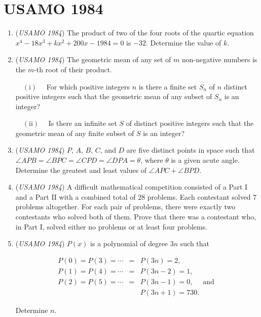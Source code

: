 \section{USAMO 1984}
        \begin{enumerate}
        	\item (\textit{USAMO 1984}) The product of two of the four roots of the quartic equation $x^4 - 18x^3 + kx^2+200x-1984=0$ is $-32$. Determine the value of $k$.


 

	\item (\textit{USAMO 1984}) The geometric mean of any set of $m$ non-negative numbers is the $m$-th root of their product.


 $\quad (\text{i})\quad$ For which positive integers $n$ is there a finite set $S_n$ of $n$ distinct positive integers such that the geometric mean of any subset of $S_n$ is an integer?


 $\quad (\text{ii})\quad$ Is there an infinite set $S$ of distinct positive integers such that the geometric mean of any finite subset of $S$ is an integer?


 

	\item (\textit{USAMO 1984}) $P$, $A$, $B$, $C$, and $D$ are five distinct points in space such that $\angle APB = \angle BPC = \angle CPD = \angle DPA = \theta$, where $\theta$ is a given acute angle. Determine the greatest and least values of $\angle APC + \angle BPD$.


 

	\item (\textit{USAMO 1984}) A difficult mathematical competition consisted of a Part I and a Part II with a combined total of $28$ problems. Each contestant solved $7$ problems altogether. For each pair of problems, there were exactly two contestants who solved both of them. Prove that there was a contestant who, in Part I, solved either no problems or at least four problems.


 

	\item (\textit{USAMO 1984}) $P(x)$ is a polynomial of degree $3n$ such that


 
 \begin{eqnarray*} P(0) = P(3) = \cdots &=& P(3n) = 2, \\ P(1) = P(4) = \cdots &=& P(3n-2) = 1, \\ P(2) = P(5) = \cdots &=& P(3n-1) = 0, \quad\text{ and }\\ && P(3n+1) = 730.\end{eqnarray*}


 Determine $n$.


 

\end{enumerate}